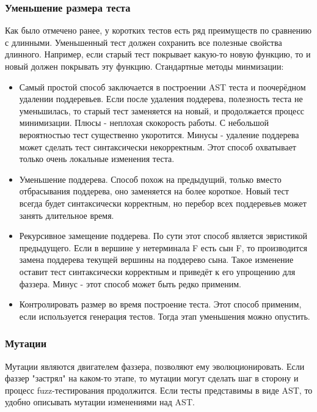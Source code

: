 \documentclass[a4paper]{article}
\begin{document}
\subsubsection{Уменьшение размера теста}
\indent

Как было отмечено ранее, у коротких тестов есть ряд преимуществ по сравнению с длинными. Уменьшенный тест должен сохранить все полезные свойства длинного. Например, если старый тест покрывает какую-то новую функцию, то и новый должен покрывать эту функцию. Стандартные методы минмизации:

\begin{itemize}
\item Самый простой способ заключается в построении AST теста и поочерёдном удалении поддеревьев. Если после удаления поддерева, полезность теста не уменьшилась, то старый тест заменяется на новый, и продолжается процесс минимизации. Плюсы - неплохая скокорость работы. С небольшой вероятностью тест  существенно укоротится. Минусы - удаление поддерева может сделать тест синтаксически некорректным. Этот способ охватывает только очень локальные изменения теста.
\item Уменьшение поддерева. Способ похож на предыдущий, только вместо отбрасывания поддерева, оно заменяется на более короткое. Новый тест всегда будет синтаксически корректным, но перебор всех поддеревьев может занять длительное время.
\item Рекурсивное замещение поддерева. По сути этот способ является эвристикой предыдущего. Если в вершине у нетерминала F есть сын F, то производится замена поддерева текущей вершины на поддерево сына. Такое изменение оставит тест синтаксически корректным и приведёт к его упрощению для фаззера. Минус - этот способ может быть редко применим.
\item Контролировать размер во время построение теста. Этот способ применим, если используется генерация тестов. Тогда этап уменьшения можно опустить.
\end{itemize}

\subsubsection{Мутации}
\indent

Мутации являются двигателем фаззера, позволяют ему эволюционировать. Если фаззер "застрял" на каком-то этапе, то мутации могут сделать шаг в сторону и процесс fuzz-тестирования продолжится. Если тесты представимы в виде AST, то удобно описывать мутации изменениями над AST. 
\end{document}
